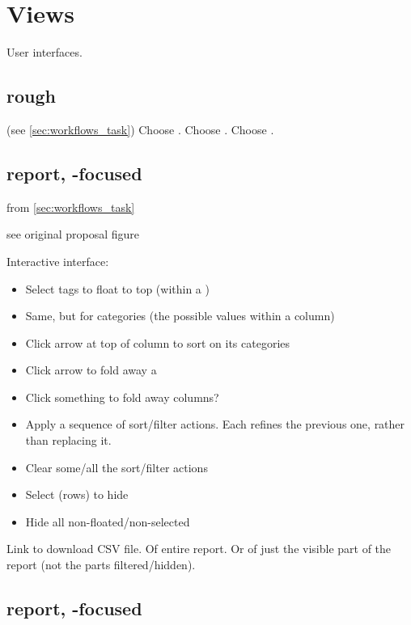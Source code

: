 \section{Views}

User interfaces.

\subsection{rough}

(see \cref{sec:workflows_task})
Choose \Task.
Choose \Methods.
Choose \Elements.

\subsection{\Performance report, \Task-focused}
\label{sec:views_performance_task}

from \cref{sec:workflows_task}

see original proposal figure

Interactive interface:
\begin{itemize}
    \item Select tags to float \Elements to top (within a \Refset)
    \item Same, but for categories (\ie the possible values within a column)
    \item Click arrow at top of column to sort on its categories
    \item Click arrow to fold away a \Refset
    \item Click something to fold away columns?
    \item Apply a sequence of sort/filter actions.  Each refines the previous one, rather than replacing it.
    \item Clear some/all the sort/filter actions
    \item Select \Elements (rows) to hide
    \item Hide all non-floated/non-selected \Elements
\end{itemize}

Link to download CSV file.
Of entire report.
Or of just the visible part of the report (not the parts filtered/hidden).

\subsection{\Performance report, \Method-focused}
\label{sec:views_performance_method}

